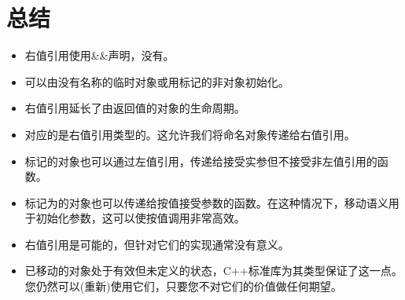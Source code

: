 \section{总结}
\begin{itemize}
	\item 右值引用使用\&\&声明，没有。
	\item 可以由没有名称的临时对象或用标记的非对象初始化。
	\item 右值引用延长了由返回值的对象的生命周期。
	\item {}对应的是右值引用类型的。这允许我们将命名对象传递给右值引用。
	\item {}标记的对象也可以通过左值引用，传递给接受实参但不接受非左值引用的函数。
	\item 标记为的对象也可以传递给按值接受参数的函数。在这种情况下，移动语义用于初始化参数，这可以使按值调用非常高效。
	\item {}右值引用是可能的，但针对它们的实现通常没有意义。
	\item 已移动的对象处于有效但未定义的状态，C++标准库为其类型保证了这一点。您仍然可以(重新)使用它们，只要您不对它们的价值做任何期望。
\end{itemize}

